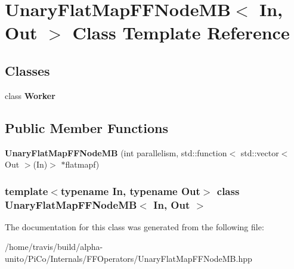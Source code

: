 \hypertarget{class_unary_flat_map_f_f_node_m_b}{\section{\-Unary\-Flat\-Map\-F\-F\-Node\-M\-B$<$ \-In, \-Out $>$ \-Class \-Template \-Reference}
\label{class_unary_flat_map_f_f_node_m_b}
}
\subsection*{\-Classes}
\begin{DoxyCompactItemize}
\item 
class {\bfseries \-Worker}
\end{DoxyCompactItemize}
\subsection*{\-Public \-Member \-Functions}
\begin{DoxyCompactItemize}
\item 
\hypertarget{class_unary_flat_map_f_f_node_m_b_a17f1250679dd16d2145fca133736d5e4}{{\bfseries \-Unary\-Flat\-Map\-F\-F\-Node\-M\-B} (int parallelism, std\-::function$<$ std\-::vector$<$ \-Out $>$(\-In)$>$ $\ast$flatmapf)}\label{class_unary_flat_map_f_f_node_m_b_a17f1250679dd16d2145fca133736d5e4}

\end{DoxyCompactItemize}
\subsubsection*{template$<$typename \-In, typename \-Out$>$ class Unary\-Flat\-Map\-F\-F\-Node\-M\-B$<$ In, Out $>$}



\-The documentation for this class was generated from the following file\-:\begin{DoxyCompactItemize}
\item 
/home/travis/build/alpha-\/unito/\-Pi\-Co/\-Internals/\-F\-F\-Operators/\-Unary\-Flat\-Map\-F\-F\-Node\-M\-B.\-hpp\end{DoxyCompactItemize}
